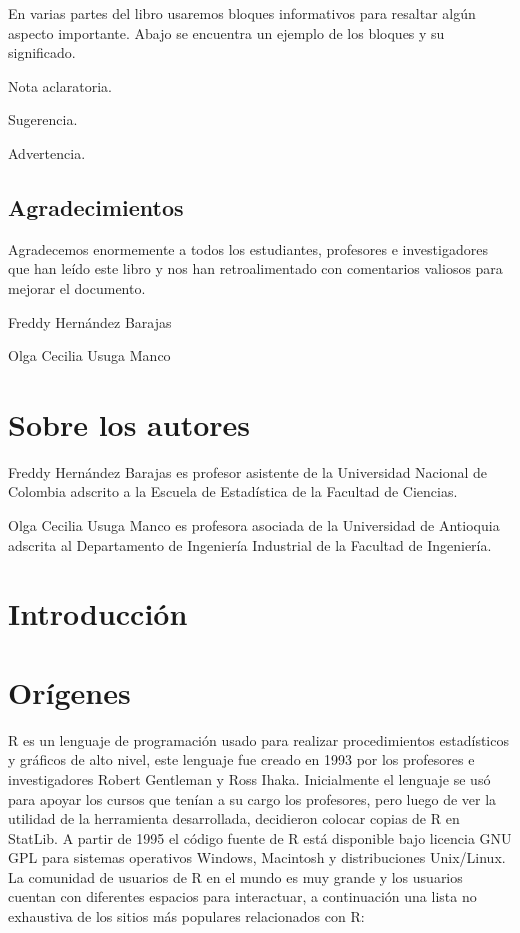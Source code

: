 \documentclass[10pt,]{krantz}
\let\BeginKnitrBlock\begin \let\EndKnitrBlock\end
\begin{document}
En varias partes del libro usaremos bloques informativos para resaltar
algún aspecto importante. Abajo se encuentra un ejemplo de los bloques y
su significado.

\BeginKnitrBlock{rmdnote}
Nota aclaratoria.
\EndKnitrBlock{rmdnote}

\BeginKnitrBlock{rmdtip}
Sugerencia.
\EndKnitrBlock{rmdtip}

\BeginKnitrBlock{rmdwarning}
Advertencia.
\EndKnitrBlock{rmdwarning}

\subsection*{Agradecimientos}\label{agradecimientos}

Agradecemos enormemente a todos los estudiantes, profesores e
investigadores que han leído este libro y nos han retroalimentado con
comentarios valiosos para mejorar el documento.

\BeginKnitrBlock{flushright}
Freddy Hernández Barajas

Olga Cecilia Usuga Manco
\EndKnitrBlock{flushright}

\section*{Sobre los autores}\label{sobre-los-autores}

Freddy Hernández Barajas es profesor asistente de la Universidad
Nacional de Colombia adscrito a la Escuela de Estadística de la Facultad
de Ciencias.

Olga Cecilia Usuga Manco es profesora asociada de la Universidad de
Antioquia adscrita al Departamento de Ingeniería Industrial de la
Facultad de Ingeniería.

\mainmatter

\section{Introducción}\label{intro}

\section{Orígenes} \label{sec:origenes}

R es un lenguaje de programación usado para realizar procedimientos
estadísticos y gráficos de alto nivel, este lenguaje fue creado en 1993
por los profesores e investigadores Robert Gentleman y Ross Ihaka.
Inicialmente el lenguaje se usó para apoyar los cursos que tenían a su
cargo los profesores, pero luego de ver la utilidad de la herramienta
desarrollada, decidieron colocar copias de R en StatLib. A partir de
1995 el código fuente de R está disponible bajo licencia GNU GPL para
sistemas operativos Windows, Macintosh y distribuciones Unix/Linux. La
comunidad de usuarios de R en el mundo es muy grande y los usuarios
cuentan con diferentes espacios para interactuar, a continuación una
lista no exhaustiva de los sitios más populares relacionados con R:
\end{document}

